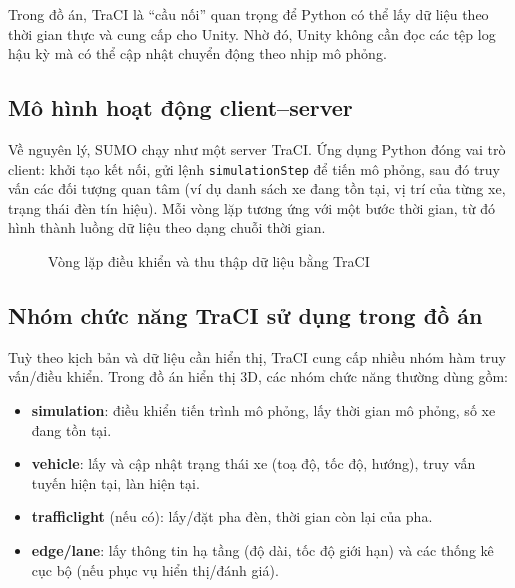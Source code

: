 \documentclass[../DoAn.tex]{subfiles}
\begin{document}
Trong đồ án, TraCI là ``cầu nối'' quan trọng để Python có thể lấy dữ liệu theo thời gian thực và cung cấp cho Unity. Nhờ đó, Unity không cần đọc các tệp log hậu kỳ mà có thể cập nhật chuyển động theo nhịp mô phỏng.

\subsection{Mô hình hoạt động client--server}
Về nguyên lý, SUMO chạy như một server TraCI. Ứng dụng Python đóng vai trò client: khởi tạo kết nối, gửi lệnh \texttt{simulationStep} để tiến mô phỏng, sau đó truy vấn các đối tượng quan tâm (ví dụ danh sách xe đang tồn tại, vị trí của từng xe, trạng thái đèn tín hiệu). Mỗi vòng lặp tương ứng với một bước thời gian, từ đó hình thành luồng dữ liệu theo dạng chuỗi thời gian.

\begin{figure}[H]
	\centering
	\caption{Vòng lặp điều khiển và thu thập dữ liệu bằng TraCI}
	\label{fig:traci-loop}
\end{figure}

\subsection{Nhóm chức năng TraCI sử dụng trong đồ án}
Tuỳ theo kịch bản và dữ liệu cần hiển thị, TraCI cung cấp nhiều nhóm hàm truy vấn/điều khiển. Trong đồ án hiển thị 3D, các nhóm chức năng thường dùng gồm:
\begin{itemize}[leftmargin=2em]
	\item \textbf{simulation}: điều khiển tiến trình mô phỏng, lấy thời gian mô phỏng, số xe đang tồn tại.
	\item \textbf{vehicle}: lấy và cập nhật trạng thái xe (toạ độ, tốc độ, hướng), truy vấn tuyến hiện tại, làn hiện tại.
	\item \textbf{trafficlight} (nếu có): lấy/đặt pha đèn, thời gian còn lại của pha.
	\item \textbf{edge/lane}: lấy thông tin hạ tầng (độ dài, tốc độ giới hạn) và các thống kê cục bộ (nếu phục vụ hiển thị/đánh giá).
\end{itemize}
\end{document}
